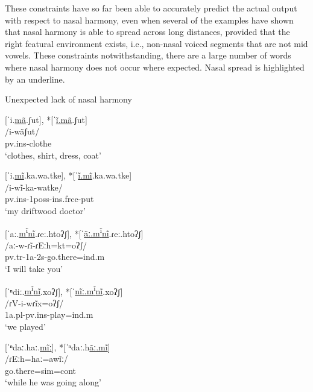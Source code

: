These constraints have so far been able to accurately predict the actual output with respect to nasal harmony, even when several of the examples have shown that nasal harmony is able to spread across long distances, provided that the right featural environment exists, i.e., non-nasal voiced segments that are not mid vowels. These constraints notwithstanding, there are a large number of words where nasal harmony does not occur where expected. Nasal spread is highlighted by an underline.

\begin{exe}
\item\label{nonasalharmony} Unexpected lack of nasal harmony
	\begin{xlist}
	\item\label{nonasalharmony1}
	\glll	 \textnormal{[ˈi.\uline{mã}.ʃut], *[ˈ\uline{ĩ.mã}.ʃut]}\\
	 /i-wãʃut/\\
	 {pv.ins}-\textnormal{clothe}\\
	 \glt `clothes, shirt, dress, coat'

	\item\label{nonasalharmony2}
	\glll \textnormal{[ˈi.\uline{mĩ}.ka.wa.tke], *[ˈ\uline{ĩ.mĩ}.ka.wa.tke]}\\
	/i-wĩ-ka-watke/\\
	{pv.ins-1poss-ins.frce-}\textnormal{put}\\
	\glt `my driftwood doctor' \citep[87]{hollow1970}%

	\item\label{nonasalharmony3}
	\glll \textnormal{[ˈaː.\uline{m\textsuperscript{ĩ}nĩ}.ɾeː.htoʔʃ], *[ˈ\uline{ãː.m\textsuperscript{ĩ}nĩ}.ɾeː.htoʔʃ]}\\
	/aː-w-ɾĩ-ɾEːh=kt=oʔʃ/\\
	{pv.tr-1a-2s}-\textnormal{go.there}={ind.m}\\
	\glt `I will take you' \citep[3]{hollow1973b}

	\item\label{nonasalharmony4}
	\glll \textnormal{[ˈⁿdiː.\uline{m\textsuperscript{ĩ}nĩ}.xoʔʃ], *[ˈ\uline{nĩː.m\textsuperscript{ĩ}nĩ}.xoʔʃ]}\\
	 /ɾV-i-wɾĩx=oʔʃ/\\
	 {1a.pl-pv.ins}-\textnormal{play}={ind.m}\\
	 \glt `we played' \citep[305]{hollow1970}

	\item\label{nonasalharmony5}
	\glll \textnormal{[ˈⁿdaː.haː.\uline{mĩː}], *[ˈⁿdaː.h\uline{ãː.mĩ}]}\\
	/ɾEːh=haː=awĩː/\\
	\textnormal{go.there}={sim=cont}\\
	\glt `while he was going along' \citep[269]{hollow1973b}


\end{xlist}
\end{exe}
